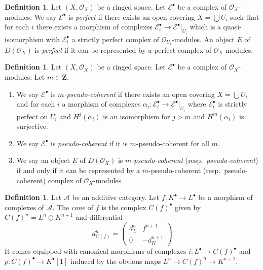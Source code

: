 \documentclass{amsart}
\theoremstyle{plain}
\theoremstyle{definition}
\newtheorem{definition}[subsection]{Definition}
\theoremstyle{remark}
\numberwithin{equation}{subsection}
\begin{document}
\begin{definition}
\label{cohomology-definition-perfect}
Let $(X, \mathcal{O}_X)$ be a ringed space.
Let $\mathcal{E}^\bullet$ be a complex of $\mathcal{O}_X$-modules.
We say $\mathcal{E}^\bullet$ is {\it perfect} if there exists
an open covering $X = \bigcup U_i$ such that for each $i$
there exists a morphism of complexes
$\mathcal{E}_i^\bullet \to \mathcal{E}^\bullet|_{U_i}$
which is a quasi-isomorphism with $\mathcal{E}_i^\bullet$
a strictly perfect complex of $\mathcal{O}_{U_i}$-modules.
An object $E$ of $D(\mathcal{O}_X)$ is {\it perfect}
if it can be represented by a perfect complex of $\mathcal{O}_X$-modules.
\end{definition}

\begin{definition}
\label{cohomology-definition-pseudo-coherent}
Let $(X, \mathcal{O}_X)$ be a ringed space. Let $\mathcal{E}^\bullet$
be a complex of $\mathcal{O}_X$-modules. Let $m \in \mathbf{Z}$.
\begin{enumerate}
\item We say $\mathcal{E}^\bullet$ is {\it $m$-pseudo-coherent}
if there exists an open covering $X = \bigcup U_i$ and for each $i$
a morphism of complexes
$\alpha_i : \mathcal{E}_i^\bullet \to \mathcal{E}^\bullet|_{U_i}$
where $\mathcal{E}_i^\bullet$ is strictly perfect on $U_i$ and
$H^j(\alpha_i)$ is an isomorphism for $j > m$ and $H^m(\alpha_i)$
is surjective.
\item We say $\mathcal{E}^\bullet$ is {\it pseudo-coherent}
if it is $m$-pseudo-coherent for all $m$.
\item We say an object $E$ of $D(\mathcal{O}_X)$ is
{\it $m$-pseudo-coherent} (resp.\ {\it pseudo-coherent})
if and only if it can be represented by a $m$-pseudo-coherent
(resp.\ pseudo-coherent) complex of $\mathcal{O}_X$-modules.
\end{enumerate}
\end{definition}

\begin{definition}
\label{derived-definition-cone}
Let $\mathcal{A}$ be an additive category.
Let $f : K^\bullet \to L^\bullet$ be a morphism of
complexes of $\mathcal{A}$. The {\it cone} of $f$
is the complex $C(f)^\bullet$ given by
$C(f)^n = L^n \oplus K^{n + 1}$ and
differential
$$
d_{C(f)}^n =
\left(
\begin{matrix}
d^n_L & f^{n + 1} \\
0 & -d_K^{n + 1}
\end{matrix}
\right)
$$
It comes equipped with canonical morphisms of complexes
$i : L^\bullet \to C(f)^\bullet$ and $p : C(f)^\bullet \to K^\bullet[1]$
induced by the obvious maps $L^n \to C(f)^n \to K^{n + 1}$.
\end{definition}
\end{document}

